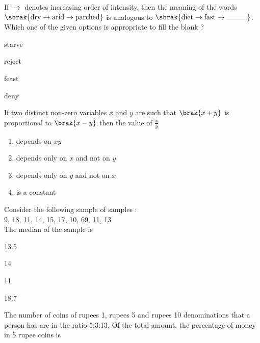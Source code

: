 \iffalse
\title{GATE Questions 22}
\author{EE24BTECH11012 - Bhavanisankar G S}
\section{ae}
\chapter{2024}
\fi
	\item If $\to$ denotes increasing order of intensity, then the meaning of the words $\sbrak{\text{dry} \to \text{arid} \to \text{parched}}$ is analogous to $\sbrak{\text{diet} \to \text{fast} \to \rule{1cm}{0.1pt}}$. Which one of the given options is appropriate to fill the blank ?
		\begin{enumerate}
		\end{enumerate}
	\item If two distinct non-zero variables $x$ and $y$ are such that $\brak{x+y}$ is proportional to $\brak{x-y}$ then the value of $\frac{x}{y}$ 
		\begin{enumerate}
			\item depends on $xy$
			\item depends only on $x$ and not on $y$
			\item depends only on $y$ and not on $x$
			\item is a constant
		\end{enumerate}
	\item Consider the following sample of samples : \\
		9, 18, 11, 14, 15, 17, 10, 69, 11, 13 \\
		The median of the sample is
		\begin{enumerate}
				\begin{multicols}{4}
				\item 13.5
				\item 14
				\item 11
				\item 18.7
				\end{multicols}
		\end{enumerate}
	\item The number of coins of rupees 1, rupees 5 and rupees 10 denominations that a person has are in the ratio 5:3:13. Of the total amount, the percentage of money in 5 rupee coins is
